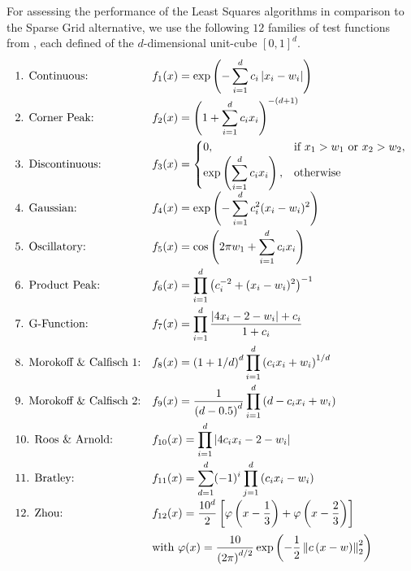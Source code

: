 \documentclass[12pt, oneside]{amsart}
\theoremstyle{definition}
\theoremstyle{remark}
\numberwithin{equation}{section}
\begin{document}
For assessing the performance of the Least Squares algorithms in comparison to 
the Sparse Grid alternative, we use the following $12$ families of test 
functions from \cite{Simulationlib_2013}, each defined of the $d$-dimensional 
unit-cube $[0,1]^d$.
\begin{align*}
	\begin{array}{l l}
		\text{1. Continuous:} & f_1(x) = \exp\left( - 
		\displaystyle\sum_{i=1}^{d} c_i \abs{x_i - w_i} \right) \\[12pt]
		\text{2. Corner Peak:} & f_2(x) = \left( 1 + 
		\displaystyle\sum_{i=1}^{d} c_i x_i 
		\right)^{-(d+1)} \\[12pt]
		\text{3. Discontinuous:} & f_3(x) = 
		\begin{cases}
			0, & \text{if } x_1 > w_1 \text{ or } x_2 > w_2, \\
			\exp\left( \displaystyle\sum_{i=1}^{d} c_i x_i \right), & 
			\text{otherwise}
		\end{cases} \\[12pt]
		\text{4. Gaussian:} & f_4(x) = \exp\left( - 
		\displaystyle\sum_{i=1}^{d} c_i^2 (x_i 
		- w_i)^2 \right) \\[12pt]
		\text{5. Oscillatory:} & f_5(x) = \cos\left( 2\pi w_1 + 
		\displaystyle\sum_{i=1}^{d} c_i x_i \right) \\[12pt]
		\text{6. Product Peak:} & f_6(x) = \displaystyle\prod_{i=1}^{d} 
		\left( c_i^{-2} + (x_i - w_i)^2 \right)^{-1} \\[12pt]
		\text{7. G-Function:} & f_7(x) = \displaystyle\prod_{i=1}^{d} 
		\frac{\abs{4x_i-2-w_i}+c_i}{1+c_i}
				\\[12pt]
		\text{8. Morokoff \& Calfisch 1:} & f_8(x) = 
		\displaystyle\left(1+1/d\right)^d  
		\prod_{i=1}^{d}\left(c_ix_i+w_i\right)^{1/d}
		\\[12pt]
		\text{9. Morokoff \& Calfisch 2:} & \displaystyle f_9(x) = 
		\frac{1}{\left(d-0.5\right)^d} 
		\prod_{i=1}^{d}\left(d-c_ix_i+w_i\right)
		\\[12pt]
		\text{10. Roos \& Arnold:} & f_{10}(x) = \displaystyle \prod_{i=1}^{d} 
		\abs{4c_ix_i-2-w_i}
		\\[12pt]
		\text{11. Bratley:} & f_{11}(x) = \displaystyle 
		\sum_{d=1}^{d}(-1)^{i}\prod_{j=1}^{d} \left(c_ix_i-w_i\right)
		\\[12pt]
		\text{12. Zhou:} & f_{12}(x) = \displaystyle \frac{10^d}{2} 
		\left[\phi\left(x-\frac13\right)+\phi\left(x-\frac23\right)\right] 
		\\[12pt]
		& \text{with }\phi(x) = \displaystyle 
		\frac{10}{\left(2\pi\right)^{d/2}} 
		\exp 
		\left(-\frac{1}{2}\norm[2]{c\left(x-w\right)}^2\right)
	\end{array}
\end{align*}
\end{document}
